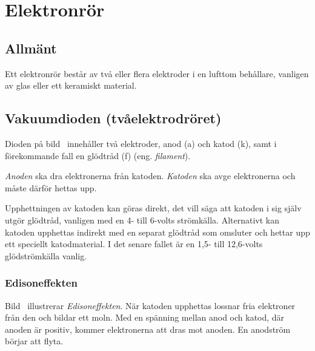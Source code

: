 \section{Elektronrör}
\label{sec:elektronror}

\subsection{Allmänt}

Ett elektronrör består av två eller flera elektroder i en lufttom behållare,
vanligen av glas eller ett keramiskt material.


\subsection{Vakuumdioden (tvåelektrodröret)}
\label{vakuumdioden}

Dioden på bild~ innehåller två elektroder, anod (a) och
katod (k), samt i förekommande fall en glödtråd (f) (eng. \emph{filament}).

\emph{Anoden} ska dra elektronerna från katoden.
\emph{Katoden} ska avge elektronerna och måste därför hettas upp.

Upphettningen av katoden kan göras direkt, det vill säga att katoden i sig
själv utgör glödtråd, vanligen med en 4- till 6-volts strömkälla.
Alternativt kan katoden upphettas indirekt med en separat glödtråd som omsluter
och hettar upp ett speciellt katodmaterial.
I det senare fallet är en 1,5- till 12,6-volts glödströmkälla vanlig.



\subsubsection{Edisoneffekten}

Bild~ illustrerar \emph{Edisoneffekten}.
När katoden upphettas lossnar fria elektroner från den och bildar ett moln.
Med en spänning mellan anod och katod, där anoden är positiv, kommer
elektronerna att dras mot anoden.
En anodström börjar att flyta.

